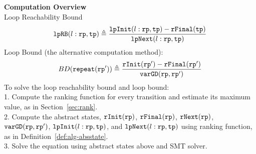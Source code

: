 \textbf{Computation Overview}
\\
 Loop Reachability Bound
\[
  \mathtt{lpRB}(l: \mathtt{rp}, \mathtt{tp}) \triangleq
    \frac{\mathtt{lpInit}(l: \mathtt{rp}, \mathtt{tp}) - \mathtt{rFinal}(\mathtt{tp})}{\mathtt{lpNext}(l: \mathtt{rp}, \mathtt{tp})}
\]
 Loop Bound (the alternative computation method):
  \[
    BD(\mathtt{repeat}(\mathtt{rp}')) \triangleq
    \frac{\mathtt{rInit}(\mathtt{rp}') - \mathtt{rFinal}(\mathtt{rp}')}{\mathtt{varGD}(\mathtt{rp}, \mathtt{rp}')}
\]
  To solve the loop reachability bound and loop bound:
  \\
  1. Compute the ranking function for every transition and estimate its maximum value, as in Section~\ref{sec:rank}.
  \\
  2. Compute the abstract states,
  $\mathtt{rInit}(\mathtt{rp})$, $\mathtt{rFinal}(\mathtt{rp})$, $\mathtt{rNext}(\mathtt{rp})$, $\mathtt{varGD}(\mathtt{rp}, \mathtt{rp}')$, 
  $\mathtt{lpInit}(l: \mathtt{rp}, \mathtt{tp})$, and $\mathtt{lpNext}(l: \mathtt{rp}, \mathtt{tp})$ using ranking function,
  as in Definition~\ref{def:alg-absstate}.
  \\
  3. Solve the equation using abstract states above and SMT solver.
